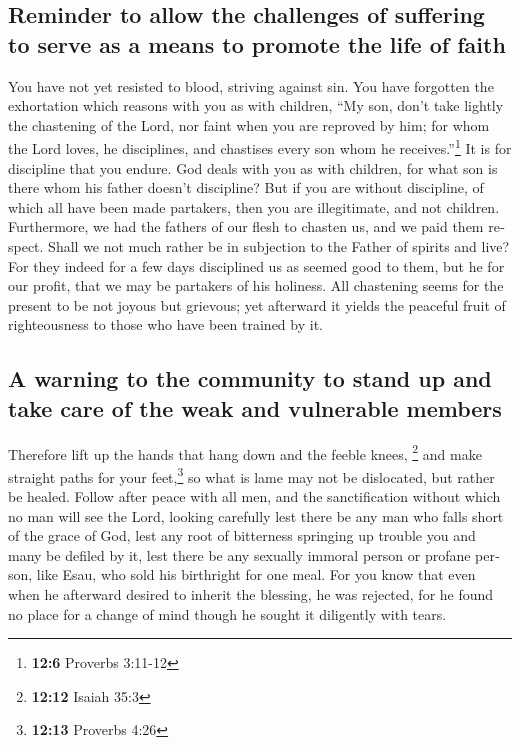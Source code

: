 \begin{paracol}{2}
\begin{otherlanguage}{english}
\hypertarget{reminder-to-allow-the-challenges-of-suffering-to-serve-as-a-means-to-promote-the-life-of-faith}{%
\subsection{Reminder to allow the challenges of suffering to serve as a
means to promote the life of
faith}\label{reminder-to-allow-the-challenges-of-suffering-to-serve-as-a-means-to-promote-the-life-of-faith}}

 You have not yet resisted to blood, striving against sin.
 You have forgotten the exhortation which reasons with you
as with children, ``My son, don't take lightly the chastening of the
Lord, nor faint when you are reproved by him;  for whom
the Lord loves, he disciplines, and chastises every son whom he
receives.''\footnote{\textbf{12:6} Proverbs 3:11-12}  It
is for discipline that you endure. God deals with you as with children,
for what son is there whom his father doesn't discipline? 
But if you are without discipline, of which all have been made
partakers, then you are illegitimate, and not children. 
Furthermore, we had the fathers of our flesh to chasten us, and we paid
them respect. Shall we not much rather be in subjection to the Father of
spirits and live?  For they indeed for a few days
disciplined us as seemed good to them, but he for our profit, that we
may be partakers of his holiness.  All chastening seems
for the present to be not joyous but grievous; yet afterward it yields
the peaceful fruit of righteousness to those who have been trained by
it.

\hypertarget{a-warning-to-the-community-to-stand-up-and-take-care-of-the-weak-and-vulnerable-members}{%
\subsection{A warning to the community to stand up and take care of the
weak and vulnerable
members}\label{a-warning-to-the-community-to-stand-up-and-take-care-of-the-weak-and-vulnerable-members}}

 Therefore lift up the hands that hang down and the
feeble knees, \footnote{\textbf{12:12} Isaiah 35:3}  and
make straight paths for your feet,\footnote{\textbf{12:13} Proverbs 4:26}
so what is lame may not be dislocated, but rather be healed.
 Follow after peace with all men, and the sanctification
without which no man will see the Lord,  looking
carefully lest there be any man who falls short of the grace of God,
lest any root of bitterness springing up trouble you and many be defiled
by it,  lest there be any sexually immoral person or
profane person, like Esau, who sold his birthright for one meal.
 For you know that even when he afterward desired to
inherit the blessing, he was rejected, for he found no place for a
change of mind though he sought it diligently with tears.


\end{otherlanguage}
\end{paracol}
